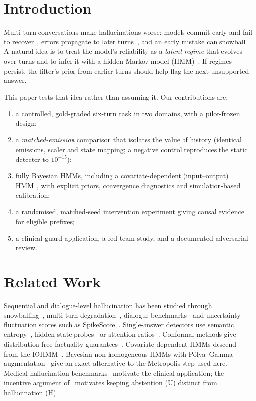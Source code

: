 \documentclass[conference]{IEEEtran}
\begin{document}
\section{Introduction}
Multi-turn conversations make hallucinations worse: models commit early and fail to recover~\cite{laban2025}, errors propagate to later turns~\cite{halluhard2026}, and an early mistake can snowball~\cite{zhang2024}. A natural idea is to treat the model's reliability as a \emph{latent regime} that evolves over turns and to infer it with a hidden Markov model (HMM)~\cite{rabiner1989}. If regimes persist, the filter's prior from earlier turns should help flag the next unsupported answer.

This paper tests that idea rather than assuming it. Our contributions are:
\begin{enumerate}
\item a controlled, gold-graded six-turn task in two domains, with a pilot-frozen design;
\item a \emph{matched-emission} comparison that isolates the value of history (identical emissions, scaler and state mapping; a negative control reproduces the static detector to $10^{-15}$);
\item fully Bayesian HMMs, including a covariate-dependent (input--output) HMM~\cite{bengio1995}, with explicit priors, convergence diagnostics and simulation-based calibration;
\item a randomised, matched-seed intervention experiment giving causal evidence for eligible prefixes;
\item a clinical guard application, a red-team study, and a documented adversarial review.
\end{enumerate}

\section{Related Work}
Sequential and dialogue-level hallucination has been studied through snowballing~\cite{zhang2024}, multi-turn degradation~\cite{laban2025,halluhard2026}, dialogue benchmarks~\cite{diahalu2024} and uncertainty fluctuation scores such as SpikeScore~\cite{spikescore2026}. Single-answer detectors use semantic entropy~\cite{farquhar2024}, hidden-state probes~\cite{kossen2024} or attention ratios~\cite{chuang2024}. Conformal methods give distribution-free factuality guarantees~\cite{mohri2024}. Covariate-dependent HMMs descend from the IOHMM~\cite{bengio1995}. Bayesian non-homogeneous HMMs with P\'olya--Gamma augmentation~\cite{holsclaw2017} give an exact alternative to the Metropolis step used here. Medical hallucination benchmarks~\cite{pal2023} motivate the clinical application; the incentive argument of~\cite{kalai2025} motivates keeping abstention (U) distinct from hallucination (H).
\end{document}
